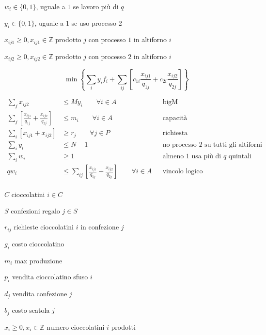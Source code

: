 \Var

$w_{i} \in \{0,1\}$, uguale a $1$ se lavoro più di $q$

$y_{i} \in \{0,1\}$, uguale a $1$ se uso processo $2$

$x_{ij1} \geq 0,x_{ij1} \in \mathbb{Z}$ prodotto $j$ con processo $1$ in altiforno $i$

$x_{ij2} \geq 0,x_{ij2} \in \mathbb{Z}$ prodotto $j$ con processo $2$ in altiforno $i$

\Fob

\begin{equation*}
	\min \left\{\sum _{i} y_{i} f_{i} +\sum _{ij}\left[ c_{1i}\frac{x_{ij1}}{q_{1j}} +c_{2i}\frac{x_{ij2}}{q_{2j}}\right]\right\}
\end{equation*}

\Vin

\begin{align*}
	\sum _{j} x_{ij2} & \leq My_{i} \qquad\forall i\in A && \text{bigM} \\
	\sum _{j}\left[\frac{x_{ij1}}{q_{1j}} +\frac{x_{ij2}}{q_{2j}}\right] & \leq m_{i} \qquad\forall i\in A && \text{capacità} \\
	\sum _{i}[ x_{ij1} +x_{ij2}] & \geq r_{j} \qquad\forall j\in P && \text{richiesta} \\
	\sum _{i} y_{i} & \leq N-1 && \text{no processo $2$ su tutti gli altiforni} \\
	\sum _{i} w_{i} & \geq 1 && \text{almeno 1 usa più di $q$ quintali} \\
	qw_{i} & \leq \sum _{ij}\left[\frac{x_{ij1}}{q_{1j}} +\frac{x_{ij2}}{q_{2j}}\right] \qquad\forall i\in A && \text{vincolo logico} \\
\end{align*}

\Es

\Par

$C$ cioccolatini $i\in C$

$S$ confezioni regalo $j\in S$

$r_{ij}$ richieste cioccolatini $i$ in confezione $j$

$g_{i}$ costo cioccolatino

$m_{i}$ max produzione

$p_{i}$ vendita cioccolatino sfuso $i$

$d_{j}$ vendita confezione $j$

$b_{j}$ costo scatola $j$

\Var

$x_{i} \geq 0,x_{i} \in \mathbb{Z}$ numero cioccolatini $i$ prodotti

